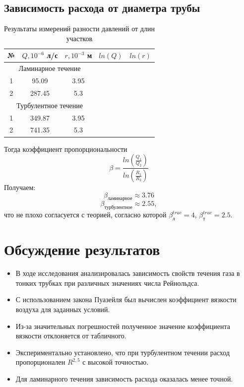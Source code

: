 \documentclass[a4paper, 10pt, twocolumn]{article}
\begin{document}
\subsection{Зависимость расхода от диаметра трубы}
\begin{table}[H]
    \centering
    \begin{tabular}{|c|c|c|c|c|} \hline
    № & $Q, 10^{-6}$ л/с & $r, 10^{-3}$ м & $ln(Q)$ & $ln(r)$ \\ \hline
    \multicolumn{3}{|c|}{Ламинарное течение} \\ \hline
    1  & 95.09   & 3.95 &  \\ \hline
    2  & 287.45  & 5.3 & \\ \hline
    \multicolumn{3}{|c|}{Турбулентное течение} \\ \hline
    1  & 349.87 & 3.95 &  \\ \hline
    2  & 741.35 & 5.3 \\ \hline
    \end{tabular}
    \caption{Результаты измерений разности давлений от длин участков}
\end{table}
    Тогда коэффициент пропорциональности $$\beta = \frac{ln\left(\frac{Q_1}{Q_2}\right)}{ln\left(\frac{R_1}{R_2}\right)}$$
    Получаем:
        $$\beta_{\text{ламинарное}} \approx 3.76   $$
        $$\beta_{\text{турбулентное}} \approx 2.55, $$
    что не плохо согласуется с теорией, согласно которой $\beta_{\text{л}}^{true} = 4$, $\beta_{\text{т}}^{true} = 2.5$.


\section{Обсуждение результатов}
    \begin{itemize}
        \item В ходе исследования анализировалась зависимость свойств течения газа в тонких трубках при различных значениях числа Рейнольдса.
        \item С использованием закона Пуазейля был вычислен коэффициент вязкости воздуха для заданных условий.
        \item Из-за значительных погрешностей полученное значение коэффициента вязкости отклоняется от табличного.
        \item Экспериментально установлено, что при турбулентном течении расход пропорционален \( R^{2,5} \) с высокой точностью.
        \item Для ламинарного течения зависимость расхода оказалась менее точной.
    \end{itemize}
    \newpage
\onecolumn
\end{document}

